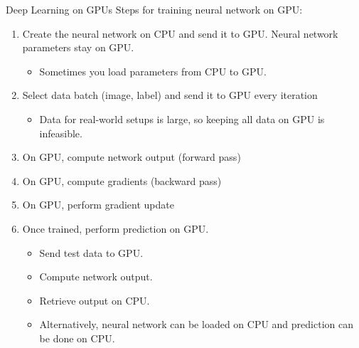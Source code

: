 \begin{frame}[allowframebreaks]

\begin{myconceptblock}{4.16}{Deep Learning on GPUs}
    Steps for training neural network on GPU:

    \begin{enumerate}
        \item
        Create the neural network on CPU and send it to GPU. Neural network parameters stay on GPU.

        \begin{itemize}
            \item Sometimes you load parameters from CPU to GPU.
        \end{itemize}
        \item
        Select data batch (image, label) and send it to GPU every iteration

        \begin{itemize}
            \item Data for real-world setups is large, so keeping all data on GPU is infeasible.
        \end{itemize}
        \item On GPU, compute network output (forward pass)
        \item On GPU, compute gradients (backward pass)
        \item On GPU, perform gradient update
        \item
        Once trained, perform prediction on GPU.

        \begin{itemize}
            \item Send test data to GPU.
            \item Compute network output.
            \item Retrieve output on CPU.
            \item Alternatively, neural network can be loaded on CPU and prediction can be done on CPU.
        \end{itemize}
    \end{enumerate}
\end{myconceptblock}

\end{frame}

